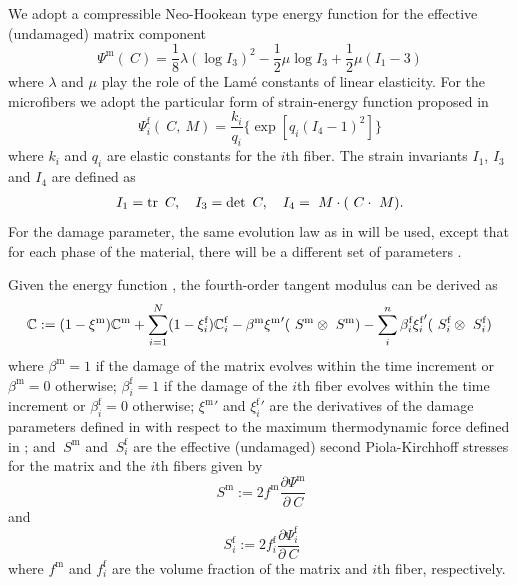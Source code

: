 \documentclass[12pt]{article}
\newcommand{\mtrx}{{\text{m}}}
\newcommand{\fiber}{{\text{f}}}
\numberwithin{equation}{section}
\begin{document}
We adopt a compressible Neo-Hookean type energy function for the
effective (undamaged) matrix component
\begin{equation}\label{eq:aniso_Psim0}
  \Psi^\mtrx (~C)
    = \frac{1}{8}\lambda (\log I_3)^2
    - \frac{1}{2}\mu \log I_3
    + \frac{1}{2}\mu( I_1 - 3)
\end{equation}
where $\lambda$ and $\mu$ play the role of the Lam\'{e} constants of
linear elasticity. For the microfibers we adopt the particular form of
strain-energy function proposed in \cite{Holzapfel.etal:2010}
\begin{equation}
  \Psi^\fiber_i(~C, ~M)
    = \frac{k_i}{q_i}
    \{ \exp[q_i(I_4 - 1)^2] \}
\end{equation}
where $k_i$ and $q_i$ are elastic constants for the $i$th fiber.  The
strain invariants $I_1$, $I_3$ and $I_4$ are defined as
\begin{gather}
  I_1 = \operatorname{\text{tr}} ~C,
  \quad
  I_3 = \det ~C,
  \quad
  I_4 = ~M \cdot (~C \cdot ~M).
\end{gather}
For the damage parameter, the same evolution law as in
 will be used, except that for each phase of the
material, there will be a different set of parameters
\cite{Chen.etal:2014}.

Given the energy function , the fourth-order
tangent modulus can be derived as
\begin{equation}\label{eq:aniso_tangent}
  \bbC
  : =
  (1-\xi^\mtrx) \bbC^\mtrx
  +
  \sum_{i=1}^N (1-\xi^\fiber_i) \bbC^\fiber_i
  -
  \beta^\mtrx {\xi^\mtrx}'  (~S^\mtrx \otimes ~S^\mtrx )
  -
  \sum_i^n \beta^\fiber_i {\xi^\fiber_i}' (~S^\fiber_i \otimes ~S^\fiber_i)
\end{equation}
where $\beta^\mtrx = 1$ if the damage of the matrix evolves within the
time increment or $\beta^\mtrx=0$ otherwise; $\beta^\fiber_i = 1$ if
the damage of the $i$th fiber evolves within the time increment or
$\beta^\fiber_i=0$ otherwise; ${\xi^\mtrx}'$ and ${\xi^\fiber_i}'$ are
the derivatives of the damage parameters defined in 
with respect to the maximum thermodynamic force defined in
; and $~S^\mtrx$ and $~S^\fiber_i$ are the effective
(undamaged) second Piola-Kirchhoff stresses for the matrix and the
$i$th fibers given by
\begin{equation}\label{eq:aniso_S0m}
  ~S^\mtrx
  :=
  2 f^\mtrx \frac{\partial \Psi^\mtrx}{\partial~C}
\end{equation}
and
\begin{equation}\label{eq:aniso_S0i}
  ~S^\fiber_i
  :=
  2 f^\fiber_i \frac{\partial \Psi^\fiber_i}{\partial~C}
\end{equation}
where $f^\mtrx$ and $f^\fiber_i$ are the volume fraction of the matrix
and $i$th fiber, respectively.
\end{document}
